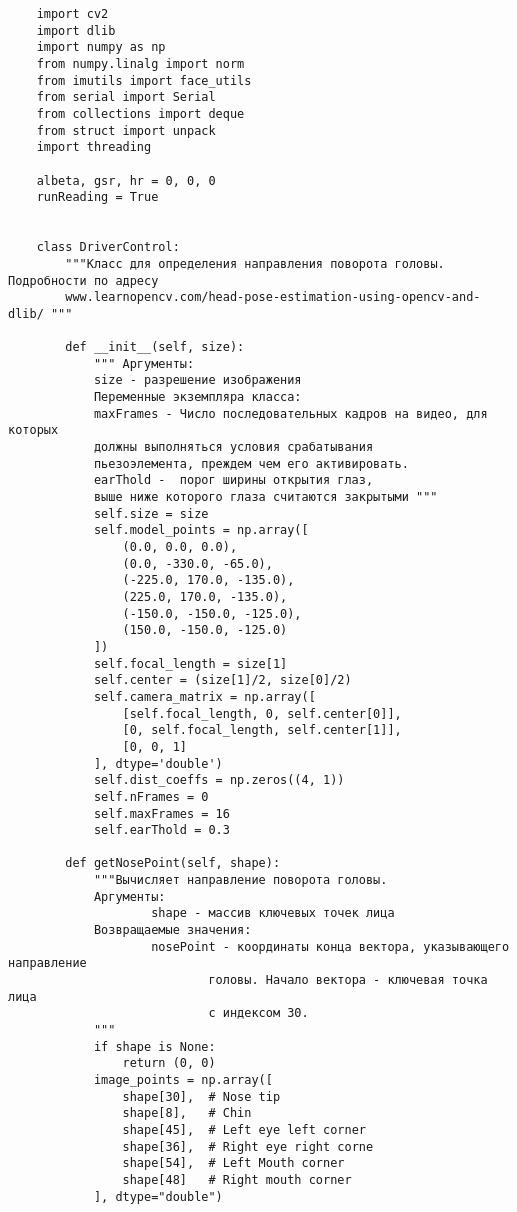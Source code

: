 \begin{verbatim}
    import cv2
    import dlib
    import numpy as np
    from numpy.linalg import norm
    from imutils import face_utils
    from serial import Serial
    from collections import deque
    from struct import unpack
    import threading

    albeta, gsr, hr = 0, 0, 0
    runReading = True


    class DriverControl:
        """Класс для определения направления поворота головы. Подробности по адресу
        www.learnopencv.com/head-pose-estimation-using-opencv-and-dlib/ """

        def __init__(self, size):
            """ Аргументы:
            size - разрешение изображения
            Переменные экземпляра класса:
            maxFrames - Число последовательных кадров на видео, для которых
            должны выполняться условия cрабатывания
            пьезоэлемента, преждем чем его активировать. 
            earThold -  порог ширины открытия глаз,
            выше ниже которого глаза считаются закрытыми """
            self.size = size
            self.model_points = np.array([
                (0.0, 0.0, 0.0),
                (0.0, -330.0, -65.0),
                (-225.0, 170.0, -135.0),
                (225.0, 170.0, -135.0),
                (-150.0, -150.0, -125.0),
                (150.0, -150.0, -125.0)
            ])
            self.focal_length = size[1]
            self.center = (size[1]/2, size[0]/2)
            self.camera_matrix = np.array([
                [self.focal_length, 0, self.center[0]],
                [0, self.focal_length, self.center[1]],
                [0, 0, 1]
            ], dtype='double')
            self.dist_coeffs = np.zeros((4, 1))
            self.nFrames = 0
            self.maxFrames = 16
            self.earThold = 0.3

        def getNosePoint(self, shape):
            """Вычисляет направление поворота головы.
            Аргументы:
                    shape - массив ключевых точек лица
            Возвращаемые значения:
                    nosePoint - координаты конца вектора, указывающего направление
                            головы. Начало вектора - ключевая точка лица
                            с индексом 30.
            """
            if shape is None:
                return (0, 0)
            image_points = np.array([
                shape[30], 	# Nose tip
                shape[8],  	# Chin
                shape[45], 	# Left eye left corner
                shape[36], 	# Right eye right corne
                shape[54], 	# Left Mouth corner
                shape[48]  	# Right mouth corner
            ], dtype="double")


\end{verbatim}
